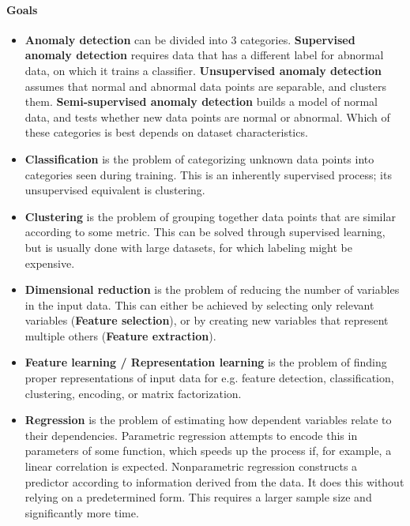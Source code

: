 \paragraph{Goals}
\begin{itemize}
	\item \textbf{Anomaly detection}
		can be divided into 3 categories. \textbf{Supervised anomaly detection} requires data that has a different label for abnormal data, on which it trains a classifier. \textbf{Unsupervised anomaly detection} assumes that normal and abnormal data points are separable, and clusters them. \textbf{Semi-supervised anomaly detection} builds a model of normal data, and tests whether new data points are normal or abnormal. Which of these categories is best depends on dataset characteristics.
	\item \textbf{Classification}
		is the problem of categorizing unknown data points into categories seen during training. This is an inherently supervised process; its unsupervised equivalent is clustering.
	\item \textbf{Clustering}
		is the problem of grouping together data points that are similar according to some metric. This can be solved through supervised learning, but is usually done with large datasets, for which labeling might be expensive.
	\item \textbf{Dimensional reduction}
		is the problem of reducing the number of variables in the input data. This can either be achieved by selecting only relevant variables (\textbf{Feature selection}), or by creating new variables that represent multiple others (\textbf{Feature extraction}).
	\item \textbf{Feature learning / Representation learning}
		is the problem of finding proper representations of input data for e.g. feature detection, classification, clustering, encoding, or matrix factorization.
	\item \textbf{Regression}
		is the problem of estimating how dependent variables relate to their dependencies. Parametric regression attempts to encode this in parameters of some function, which speeds up the process if, for example, a linear correlation is expected. Nonparametric regression constructs a predictor according to information derived from the data. It does this without relying on a predetermined form. This requires a larger sample size and significantly more time.
\end{itemize}

